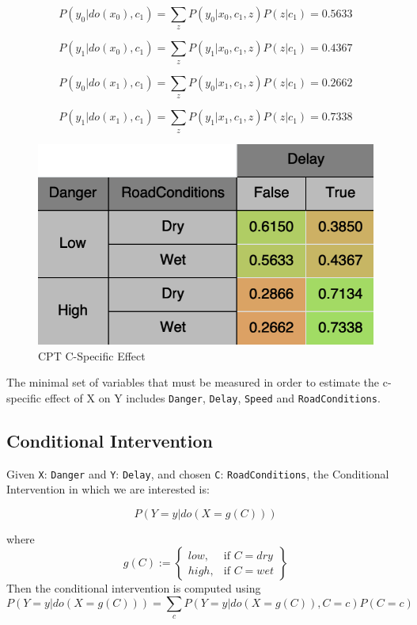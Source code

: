\documentclass[a4paper,12pt]{article} %
\begin{document}
\begin{equation*}
P(y_0|do(x_0), c_1)= \sum_{z} P(y_0|x_0, c_1, z) P(z|c_1)=0.5633
\end{equation*}

\begin{equation*}
P(y_1|do(x_0), c_1)= \sum_{z} P(y_1|x_0, c_1, z) P(z|c_1)=0.4367
\end{equation*}

\begin{equation*}
P(y_0|do(x_1), c_1)= \sum_{z} P(y_0|x_1, c_1, z) P(z|c_1)=0.2662
\end{equation*}

\begin{equation*}
P(y_1|do(x_1), c_1)= \sum_{z} P(y_1|x_1, c_1, z) P(z|c_1)=0.7338
\end{equation*}

\begin{figure}[H]
	\centering
	\includegraphics[width=.5\linewidth]{../code/c-specific-effect.png}	
	\caption*{CPT C-Specific Effect}
	\label{fig:c-specific-effect}
\end{figure}
The minimal set of variables that must be measured in order to estimate the c-specific effect of X on Y includes \texttt{Danger}, \texttt{Delay}, \texttt{Speed} and \texttt{RoadConditions}.
\subsection*{Conditional Intervention}
Given \texttt{X}: \texttt{Danger} and \texttt{Y}: \texttt{Delay}, and chosen \texttt{C}: \texttt{RoadConditions}, the Conditional Intervention in which we are interested is:

$$P(Y=y|do(X=g(C)))$$

where $$ g(C) := \left\{\begin{array}{lr}
low, & \text{if } C=dry\\
high, & \text{if } C=wet
\end{array}\right\}$$
Then the conditional intervention is computed using 
\begin{equation}
	P(Y=y|do(X=g(C))) = \sum_c P(Y=y|do(X=g(C)), C=c)P(C=c)
\end{equation}
$$$$
\end{document}

